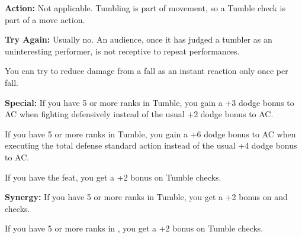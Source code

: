\textbf{Action:} Not applicable. Tumbling is part of movement, so a Tumble check is part of a move action.

\textbf{Try Again:} Usually no. An audience, once it has judged a tumbler as an uninteresting performer, is not receptive to repeat performances.

You can try to reduce damage from a fall as an instant reaction only once per fall.

\textbf{Special:} If you have 5 or more ranks in Tumble, you gain a +3 dodge bonus to AC when fighting defensively instead of the usual +2 dodge bonus to AC.

If you have 5 or more ranks in Tumble, you gain a +6 dodge bonus to AC when executing the total defense standard action instead of the usual +4 dodge bonus to AC.

If you have the  feat, you get a +2 bonus on Tumble checks.

\textbf{Synergy:} If you have 5 or more ranks in Tumble, you get a +2 bonus on  and  checks.

If you have 5 or more ranks in , you get a +2 bonus on Tumble checks.
